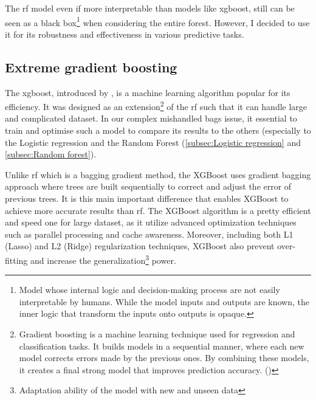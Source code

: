 \documentclass[12pt]{article}
\begin{document}
 
 

 

The \acrshort{rf} model even if more interpretable than models like \acrshort{xgboost}, still can be seen as a black box\footnote{Model whose internal logic and decision-making process are not easily interpretable by humans. While the model inputs and outputs are known, the inner logic that transform the inputs onto outputs is opaque.} when considering the entire forest. However, I decided to use it for its robustness and effectiveness in various predictive tasks.







\newpage
\subsection{Extreme gradient boosting}
\label{subsec:Extreme Gradient Boosting}

The \acrlong{xgboost}, introduced by \cite{https://arxiv.org/pdf/1603.02754}, is a machine learning algorithm popular for its efficiency. It was designed as an extension\footnote{Gradient boosting is a machine learning technique used for regression and classification tasks. It builds models in a sequential manner, where each new model corrects errors made by the previous ones. By combining these models, it creates a final strong model that improves prediction accuracy. (\cite{Friedman2001})} of the \acrshort{rf} such that it can handle large and complicated dataset. In our complex mishandled bags issue, it essential to train and optimise such a model to compare its results to the others (especially to the Logistic regression and the Random Forest (\autoref{subsec:Logistic regression} and \autoref{subsec:Random forest}).

\noindent Unlike \acrshort{rf} which is a bagging gradient method, the XGBoost uses gradient bagging approach where trees are built sequentially to correct and adjust the error of previous trees. It is this main important difference that enables XGBoost to achieve more accurate results than \acrshort{rf}. The XGBoost algorithm is a pretty efficient and speed one for large dataset, as it utilize advanced optimization techniques such as parallel processing and cache awareness. Moreover, including both L1 (Lasso) and L2 (Ridge) regularization techniques, XGBoost also prevent over-fitting and increase the generalization\footnote{Adaptation ability of the model with new and unseen data} power. \hfill \break
\end{document}
